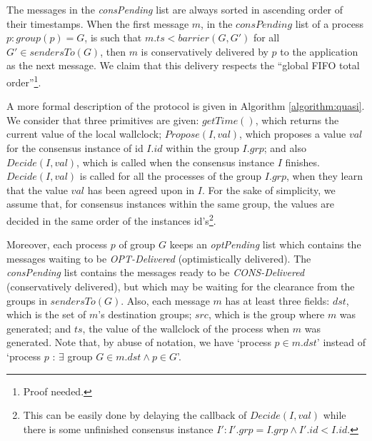 \documentclass[times, 10pt]{article}
\begin{document}
The messages in the \textit{consPending} list are always sorted in ascending order of their timestamps. When the first message $m$, in the $consPending$ list of a process $p : group(p) = G$, is such that $m.ts < barrier(G, G')$ for all $G' \in sendersTo(G)$, then $m$ is conservatively delivered by $p$ to the application as the next message. We claim that this delivery respects the ``global FIFO total order''\footnote{Proof needed.}.


A more formal description of the protocol is given in Algorithm \ref{algorithm:quasi}. We consider that three primitives are given: $getTime()$, which returns the current value of the local wallclock; $Propose(I, val)$, which proposes a value $val$ for the consensus instance of id $I.id$ within the group $I.grp$; and also $Decide(I, val)$, which is called when the consensus instance $I$ finishes. $Decide(I, val)$ is called for all the processes of the group $I.grp$, when they learn that the value $val$ has been agreed upon in $I$. For the sake of simplicity, we assume that, for consensus instances within the same group, the values are decided in the same order of the instances id's\footnote{This can be easily done by delaying the callback of $Decide(I, val)$ while there is some unfinished consensus instance $I': I'.grp = I.grp \wedge I'.id < I.id$.}.

Moreover, each process $p$ of group $G$ keeps an \textit{optPending} list which contains the messages waiting to be \textit{OPT-Delivered} (optimistically delivered). The \mbox{\textit{consPending}} list contains the messages ready to be \textit{CONS-Delivered} (conservatively delivered), but which may be waiting for the clearance from the groups in $sendersTo(G)$. Also, each message $m$ has at least three fields: $dst$, which is the set of $m$'s destination groups; $src$, which is the group where $m$ was generated; and $ts$, the value of the wallclock of the process when $m$ was generated. Note that, by abuse of notation, we have `process $p \in m.dst$' instead of `process $p$ : $\exists$ group $G \in m.dst \wedge p \in G$'.
\end{document}
